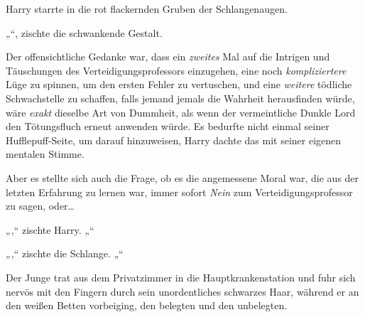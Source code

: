 Harry starrte in die rot flackernden Gruben der Schlangenaugen.

„“, zischte die schwankende Gestalt.

Der offensichtliche Gedanke war, dass ein \emph{zweites} Mal auf die Intrigen und Täuschungen des Verteidigungsprofessors einzugehen, eine noch \emph{kompliziertere} Lüge zu spinnen, um den ersten Fehler zu vertuschen, und eine \emph{weitere} tödliche Schwachstelle zu schaffen, falls jemand jemals die Wahrheit herausfinden würde, wäre \emph{exakt} dieselbe Art von Dummheit, als wenn der vermeintliche Dunkle Lord den Tötungsfluch erneut anwenden würde. Es bedurfte nicht einmal seiner Hufflepuff-Seite, um darauf hinzuweisen, Harry dachte das mit seiner eigenen mentalen Stimme.

Aber es stellte sich auch die Frage, ob es die angemessene Moral war, die aus der letzten Erfahrung zu lernen war, immer sofort \emph{Nein} zum Verteidigungsprofessor zu sagen, oder…

„,“ zischte Harry. „“

„,“ zischte die Schlange. „“

\later

Der Junge trat aus dem Privatzimmer in die Hauptkrankenstation und fuhr sich nervös mit den Fingern durch sein unordentliches schwarzes Haar, während er an den weißen Betten vorbeiging, den belegten und den unbelegten.


